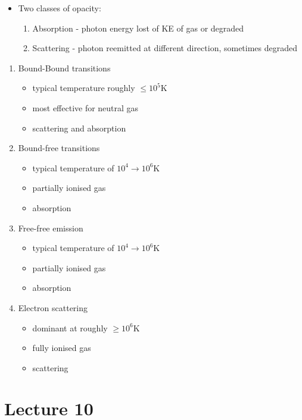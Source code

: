 \documentclass[a4paper,11pt,normalem]{article}
\begin{document}
\begin{itemize}
    \item Two classes of opacity:
        \begin{enumerate}
            \item Absorption - photon energy lost of KE of gas or degraded
            \item Scattering - photon reemitted at different direction, sometimes degraded
        \end{enumerate}
\end{itemize}

\begin{enumerate}
    \item Bound-Bound transitions
        \begin{itemize}
            \item typical temperature roughly \(\leq 10^5\)K
            \item most effective for neutral gas
            \item scattering and absorption
        \end{itemize}
    \item Bound-free transitions
        \begin{itemize}
            \item typical temperature of \(10^4 \to 10^6\)K
            \item partially ionised gas
            \item absorption
        \end{itemize}
    \item Free-free emission
        \begin{itemize}
            \item typical temperature of \(10^4 \to 10^6\)K
            \item partially ionised gas
            \item absorption
        \end{itemize}
    \item Electron scattering
        \begin{itemize}
            \item dominant at roughly \(\geq 10^6\)K
            \item fully ionised gas
            \item scattering
        \end{itemize}
\end{enumerate}

\section{Lecture 10}
\end{document}
